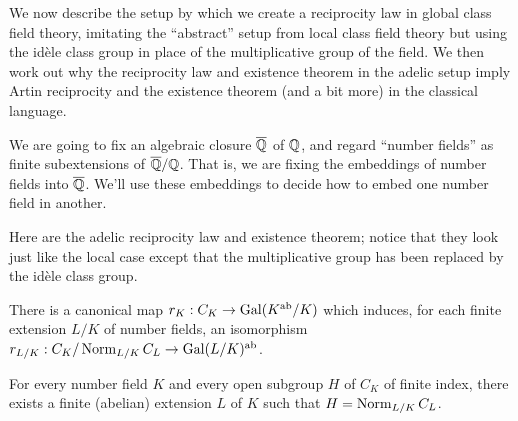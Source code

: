 %
%
%
%
%
%
%

We now describe the setup by which we create a reciprocity law in
global class field theory, imitating the ``abstract'' setup from local
class field theory but using the id\`ele class group in place of the
multiplicative group of the field. We then work out why the reciprocity
law and existence theorem in the adelic setup imply Artin reciprocity
and the existence theorem (and a bit more) in the classical language.

 We are going to fix an algebraic closure
$\overline{\mathbb{Q}}$ of $\mathbb{Q}$, and regard ``number fields'' as finite
subextensions of $\overline{\mathbb{Q}}/\mathbb{Q}$. That is, we are fixing the
embeddings of number fields into $\overline{\mathbb{Q}}$. We'll use these embeddings
to decide how to embed one number field in another.


Here are the adelic reciprocity law and existence theorem; notice that
they look just like the local case except that the multiplicative group
has been replaced by the id\`ele class group.
\begin{theorem}
There is a canonical map $r_K: C_K \to \operatorname{Gal}(K^{\operatorname{ab}}/K)$ which
induces, for each finite extension $L/K$ of number fields, an
isomorphism $r_{L/K}: C_K/\operatorname{Norm}_{L/K} C_L \to \operatorname{Gal}(L/K)^{\operatorname{ab}}$.
\end{theorem}
\begin{theorem} \label{T:adelic existence theorem1}
For every number field $K$ and 
every open subgroup $H$ of $C_K$ of finite index, there exists
a finite (abelian) extension $L$ of $K$ such that
$H = \operatorname{Norm}_{L/K} C_L$.
\end{theorem}


